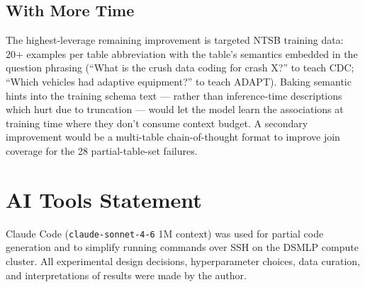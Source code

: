 \documentclass[10pt,twocolumn]{article}
\begin{document}
\subsection*{With More Time}
The highest-leverage remaining improvement is targeted NTSB training data: 20+ examples per table abbreviation with the table's semantics embedded in the question phrasing (``What is the crush data coding for crash X?'' to teach CDC; ``Which vehicles had adaptive equipment?'' to teach ADAPT). Baking semantic hints into the training schema text — rather than inference-time descriptions which hurt due to truncation — would let the model learn the associations at training time where they don't consume context budget. A secondary improvement would be a multi-table chain-of-thought format to improve join coverage for the 28 partial-table-set failures.

\section{AI Tools Statement}

Claude Code (\texttt{claude-sonnet-4-6} 1M context) was used for partial code generation and to simplify running commands over SSH on the DSMLP compute cluster. All experimental design decisions, hyperparameter choices, data curation, and interpretations of results were made by the author.
\end{document}
